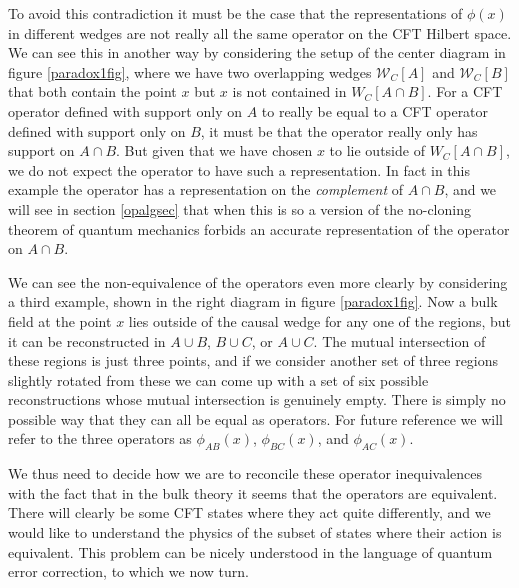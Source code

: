 \documentclass[11pt]{article}
\newcommand{\W}{\mathcal{W}}
\begin{document}
To avoid this contradiction it must be the case that the representations of $\phi(x)$ in different wedges are not really all the same operator on the CFT Hilbert space.  We can see this in another way by considering the setup of the center diagram in figure \ref{paradox1fig}, where we have two overlapping wedges $\W_C[A]$ and $\W_C[B]$ that both contain the point $x$ but $x$ is not contained in $W_C[A\cap B]$.  For a CFT operator defined with support only on $A$ to really be equal to a CFT operator defined with support only on $B$, it must be that the operator really only has support on $A\cap B$.  But given that we have chosen $x$ to lie outside of $W_C[A\cap B]$, we do not expect the operator to have such a representation.  In fact in this example the operator has a representation on the \textit{complement} of $A \cap B$, and we will see in section \eqref{opalgsec} that when this is so a version of the no-cloning theorem of quantum mechanics forbids an accurate representation of the operator on $A\cap B$.

We can see the non-equivalence of the operators even more clearly by considering a third example, shown in the right diagram in figure \ref{paradox1fig}.  Now a bulk field at the point $x$ lies outside of the causal wedge for any one of the regions, but it can be reconstructed in $A \cup B$, $B \cup C$, or $A \cup C$.  The mutual intersection of these regions is just three points, and if we consider another set of three regions slightly rotated from these we can come up with a set of six possible reconstructions whose mutual intersection is genuinely empty.  There is simply no possible way that they can all be equal as operators.  For future reference we will refer to the three operators as $\phi_{AB}(x)$, $\phi_{BC}(x)$, and $\phi_{AC}(x)$.  

We thus need to decide how we are to reconcile these operator inequivalences with the fact that in the bulk theory it seems that the operators are equivalent.  There will clearly be some CFT states where they act quite differently, and we would like to understand the physics of the subset of states where their action is equivalent.  This problem can be nicely understood in the language of quantum error correction, to which we now turn.
\end{document}
